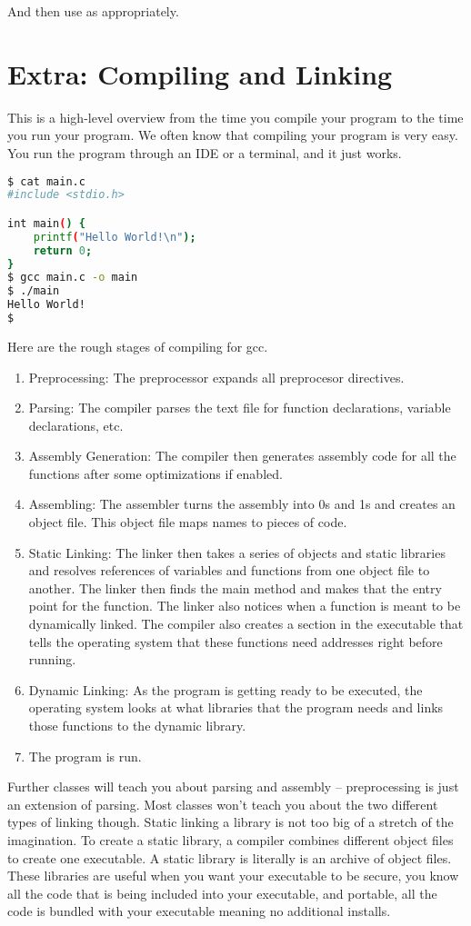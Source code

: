 And then use as appropriately.

\section{Extra: Compiling and Linking}

This is a high-level overview from the time you compile your program to the time you run your program.
We often know that compiling your program is very easy.
You run the program through an IDE or a terminal, and it just works.

\begin{lstlisting}[language=bash]
$ cat main.c
#include <stdio.h>

int main() {
    printf("Hello World!\n");
    return 0;
}
$ gcc main.c -o main
$ ./main
Hello World!
$
\end{lstlisting}

Here are the rough stages of compiling for gcc.

\begin{enumerate}
\item Preprocessing: The preprocessor expands all preprocesor directives.
\item Parsing: The compiler parses the text file for function declarations, variable declarations, etc.
\item Assembly Generation: The compiler then generates assembly code for all the functions after some optimizations if enabled.
\item Assembling: The assembler turns the assembly into 0s and 1s and creates an object file. This object file maps names to pieces of code.
\item Static Linking: The linker then takes a series of objects and static libraries and resolves references of variables and functions from one object file to another. The linker then finds the main method and makes that the entry point for the function. The linker also notices when a function is meant to be dynamically linked. The compiler also creates a section in the executable that tells the operating system that these functions need addresses right before running. 
\item Dynamic Linking: As the program is getting ready to be executed, the operating system looks at what libraries that the program needs and links those functions to the dynamic library.
\item The program is run.
\end{enumerate}

Further classes will teach you about parsing and assembly -- preprocessing is just an extension of parsing.
Most classes won't teach you about the two different types of linking though.
Static linking a library is not too big of a stretch of the imagination.
To create a static library, a compiler combines different object files to create one executable.
A static library is literally is an archive of object files.
These libraries are useful when you want your executable to be secure, you know all the code that is being included into your executable, and portable, all the code is bundled with your executable meaning no additional installs.

